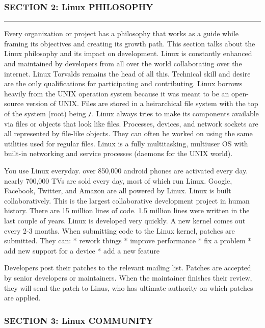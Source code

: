 \subsubsection{SECTION 2: Linux
PHILOSOPHY}\label{section-2-linux-philosophy}

\begin{center}\rule{3in}{0.4pt}\end{center}

Every organization or project has a philosophy that works as a guide
while framing its objectives and creating its growth path. This section
talks about the Linux philosophy and its impact on development. Linux is
constantly enhanced and maintained by developers from all over the world
collaborating over the internet. Linux Torvalds remains the head of all
this. Technical skill and desire are the only qualifications for
participating and contributing. Linux borrows heavily from the UNIX
operation system because it was meant to be an open-source version of
UNIX. Files are stored in a heirarchical file system with the top of the
system (root) being \texttt{/}. Linux always tries to make its
components available via files or objects that look like files.
Processes, devices, and network sockets are all represented by file-like
objects. They can often be worked on using the same utilities used for
regular files. Linux is a fully multitasking, multiuser OS with built-in
networking and service processes (daemons for the UNIX world).

You use Linux everyday. over 850,000 android phones are activated every
day. nearly 700,000 TVs are sold every day, most of which run Linux.
Google, Facebook, Twitter, and Amazon are all powered by Linux. Linux is
built collaboratively. This is the largest collaborative development
project in human history. There are 15 million lines of code. 1.5
million lines were written in the last couple of years. Linux is
developed very quickly. A new kernel comes out every 2-3 months. When
submitting code to the Linux kernel, patches are submitted. They can: *
rework things * improve performance * fix a problem * add new support
for a device * add a new feature

Developers post their patches to the relevant mailing list. Patches are
accepted by senior developers or maintainers. When the maintainer
finishes their review, they will send the patch to Linus, who has
ultimate authority on which patches are applied.

\subsubsection{SECTION 3: Linux
COMMUNITY}\label{section-3-linux-community}

